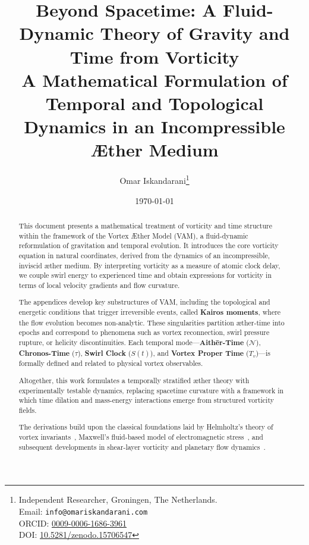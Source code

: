 \documentclass[a4paper,12pt]{article}
\title{
    \textbf{Beyond Spacetime: A Fluid-Dynamic Theory of Gravity and Time from Vorticity}\\[0.5em]
    \large A Mathematical Formulation of Temporal and Topological Dynamics in an Incompressible Æther Medium\\[0.5em]
}
\author{
    Omar Iskandarani\thanks{
        Independent Researcher, Groningen, The Netherlands.\\
        Email: \texttt{info@omariskandarani.com}\\
        ORCID: \href{https://orcid.org/0009-0006-1686-3961}{0009-0006-1686-3961}\\
        DOI: \href{https://doi.org/10.5281/zenodo.15706547}{10.5281/zenodo.15706547}
    }
}
\date{\today}
\begin{document}
    \maketitle
    \vspace{-2ex}


    \begin{abstract}
        This document presents a mathematical treatment of vorticity and time structure within the framework of the Vortex Æther Model (VAM), a fluid-dynamic reformulation of gravitation and temporal evolution. It introduces the core vorticity equation in natural coordinates, derived from the dynamics of an incompressible, inviscid æther medium. By interpreting vorticity as a measure of atomic clock delay, we couple swirl energy to experienced time and obtain expressions for vorticity in terms of local velocity gradients and flow curvature.

        The appendices develop key substructures of VAM, including the topological and energetic conditions that trigger irreversible events, called \textbf{Kairos moments}, where the flow evolution becomes non-analytic. These singularities partition æther-time into epochs and correspond to phenomena such as vortex reconnection, swirl pressure rupture, or helicity discontinuities. Each temporal mode—\textbf{Aithēr-Time} (\( \mathcal{N} \)), \textbf{Chronos-Time} (\( \tau \)), \textbf{Swirl Clock} (\( S(t) \)), and \textbf{Vortex Proper Time} (\( T_v \))—is formally defined and related to physical vortex observables.

        Altogether, this work formulates a temporally stratified æther theory with experimentally testable dynamics, replacing spacetime curvature with a framework in which time dilation and mass-energy interactions emerge from structured vorticity fields.

        The derivations build upon the classical foundations laid by Helmholtz's theory of vortex invariants~\cite{helmholtz1858integralsvortex}, Maxwell's fluid-based model of electromagnetic stress~\cite{maxwell1861pressure}, and subsequent developments in shear-layer vorticity and planetary flow dynamics~\cite{lamb1932, rossby1939}.


    \end{abstract}


    \vfill
%
    \newpage
    \tableofcontents
    \newpage


    \appendix
    \def\standalonechapter{false}
    
    
    
    
    

    
    
\end{document}
